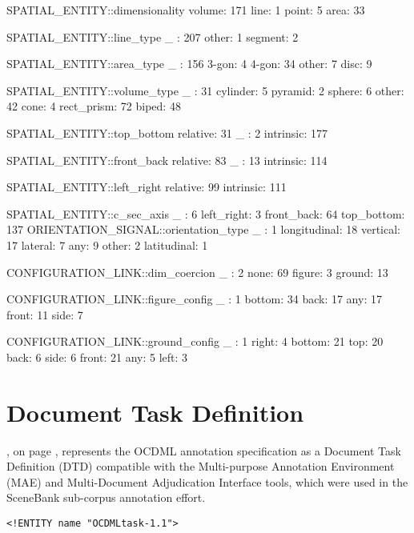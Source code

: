 \documentclass[11pt]{article}
\begin{document}
\begin{appendix}
    SPATIAL_ENTITY::dimensionality 
    volume: 171 
    line: 1 
    point: 5 
    area: 33 

    SPATIAL_ENTITY::line_type 
    _ : 207 
    other: 1 
    segment: 2 

    SPATIAL_ENTITY::area_type 
    _ : 156 
    3-gon: 4 
    4-gon: 34 
    other: 7 
    disc: 9 

    SPATIAL_ENTITY::volume_type 
    _ : 31 
    cylinder: 5 
    pyramid: 2 
    sphere: 6 
    other: 42 
    cone: 4 
    rect_prism: 72 
    biped: 48 

    SPATIAL_ENTITY::top_bottom 
    relative: 31 
    _ : 2 
    intrinsic: 177 

    SPATIAL_ENTITY::front_back 
    relative: 83 
    _ : 13 
    intrinsic: 114 

    SPATIAL_ENTITY::left_right 
    relative: 99 
    intrinsic: 111 

    SPATIAL_ENTITY::c_sec_axis 
    _ : 6 
    left_right: 3 
    front_back: 64 
    top_bottom: 137 
    ORIENTATION_SIGNAL::orientation_type 
    _ : 1 
    longitudinal: 18 
    vertical: 17 
    lateral: 7 
    any: 9 
    other: 2 
    latitudinal: 1 

    CONFIGURATION_LINK::dim_coercion 
    _ : 2 
    none: 69 
    figure: 3 
    ground: 13 

    CONFIGURATION_LINK::figure_config 
    _ : 1 
    bottom: 34 
    back: 17 
    any: 17 
    front: 11 
    side: 7 

    CONFIGURATION_LINK::ground_config 
    _ : 1 
    right: 4 
    bottom: 21 
    top: 20 
    back: 6 
    side: 6 
    front: 21 
    any: 5 
    left: 3
    \fi
    \section{Document Task Definition} %
    \label{sec:document_task_definition}
    , on page \pageref{fig:dtd}, represents the OCDML annotation specification as a Document Task Definition (DTD) compatible with the Multi-purpose Annotation Environment (MAE) and Multi-Document Adjudication Interface tools\cite{stubbs2011mae}, which were used in the SceneBank sub-corpus annotation effort.
    \begin{figure*}
        \begin{verbatim}
<!ENTITY name "OCDMLtask-1.1">


\end{verbatim}
\end{figure*}
\end{appendix}
\end{document}
